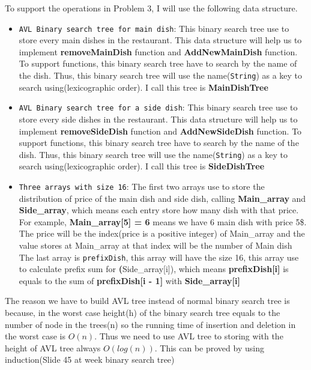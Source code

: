 \documentclass{article}
\begin{document}
	To support the operations in Problem 3, I will use the following data structure.
	\begin{itemize}
		\item \verb|AVL Binary search tree for main dish|: This binary search tree use to store every main dishes in the restaurant. This data structure will help us to implement \textbf{removeMainDish} function and \textbf{AddNewMainDish} function. To support functions, this binary search tree have to search by the name of the dish. Thus, this binary search tree will use the name(\verb|String|) as a key to search using(lexicographic order). I call this tree is \textbf{MainDishTree}
		\item \verb|AVL Binary search tree for a side dish|: This binary search tree use to store every side dishes in the restaurant. This data structure will help us to implement \textbf{removeSideDish} function and \textbf{AddNewSideDish} function. To support functions, this binary search tree have to search by the name of the dish. Thus, this binary search tree will use the name(\verb|String|) as a key to search using(lexicographic order). I call this tree is \textbf{SideDishTree}
		\item \verb|Three arrays with size 16|: The first two arrays use to store the distribution of price of the main dish and side dish, calling \textbf{Main\_array} and \textbf{Side\_array}, which means each entry store how many dish with that price. For example, \textbf{Main\_array[5] = 6} means we have 6 main dish with price 5\$. The price will be the index(price is a positive integer) of Main\_array and the value stores at Main\_array at that index will be the number of Main dish 
		The last array is \verb|prefixDish|, this array will have the size 16, this array use to calculate prefix sum for \textbf(Side\_array[i]), which means \textbf{prefixDish[i]} is equals to the sum of \textbf{prefixDish[i - 1]} with \textbf{Side\_array[i]}
	\end{itemize}

	The reason we have to build AVL tree instead of normal binary search tree is because, in the worst case height(h) of the binary search tree equals to the number of node in the trees(n) so the running time of insertion and deletion in the worst case is \(O(n)\). Thus we need to use AVL tree to storing with the height of AVL tree always \(O(log(n))\). This can be proved by using induction(Slide 45 at week binary search tree)
	
\end{document}
